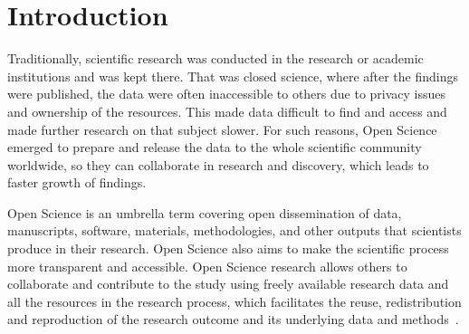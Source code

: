 \chapter{Introduction}

\label{introduction}




Traditionally, scientific research was conducted in the research or academic institutions and was kept there. That was closed science, where after the findings were published, the data were often inaccessible to others due to privacy issues and ownership of the resources. This made data difficult to find and access and made further research on that subject slower. For such reasons, Open Science emerged to prepare and release the data to the whole scientific community worldwide, so they can collaborate in research and discovery, which leads to faster growth of findings.

Open Science is an umbrella term covering open dissemination of data, manuscripts, software, materials, methodologies, and other outputs that scientists produce in their research. Open Science also aims to make the scientific process more transparent and accessible. Open Science research allows others to collaborate and contribute to the study using freely available research data and all the resources in the research process, which facilitates the reuse, redistribution and reproduction of the research outcome and its underlying data and methods~\cite{fecher2014opening}. 

